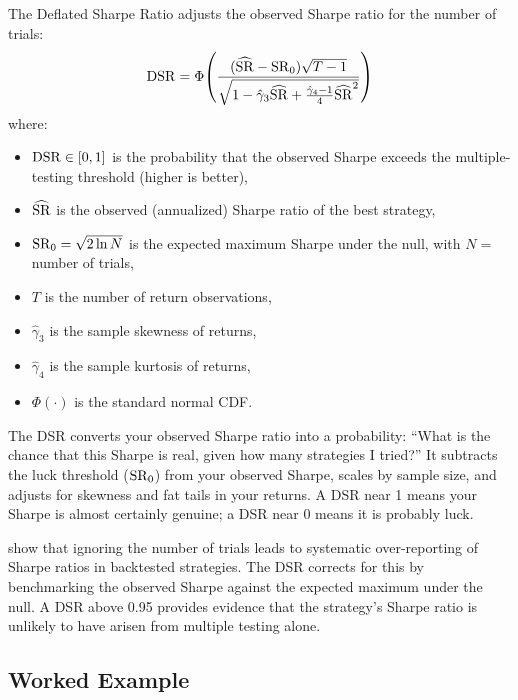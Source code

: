 The Deflated Sharpe Ratio adjusts the observed Sharpe ratio for the number of trials:
\begin{equation}
\label{eq:dsr}
\operatorname{DSR} = \Phi\!\left(\frac{(\widehat{\operatorname{SR}} - \operatorname{SR}_0)\sqrt{T-1}}{\sqrt{1 - \hat{\gamma}_3 \widehat{\operatorname{SR}} + \frac{\hat{\gamma}_4 - 1}{4}\widehat{\operatorname{SR}}^2}}\right)
\end{equation}
where:
\begin{itemize}[nosep]
  \item $\operatorname{DSR} \in [0, 1]$ is the probability that the observed Sharpe exceeds the multiple-testing threshold (higher is better),
  \item $\widehat{\operatorname{SR}}$ is the observed (annualized) Sharpe ratio of the best strategy,
  \item $\operatorname{SR}_0 = \sqrt{2 \ln N}$ is the expected maximum Sharpe under the null, with $N =$ number of trials,
  \item $T$ is the number of return observations,
  \item $\hat{\gamma}_3$ is the sample skewness of returns,
  \item $\hat{\gamma}_4$ is the sample kurtosis of returns,
  \item $\Phi(\cdot)$ is the standard normal CDF.
\end{itemize}

\begin{intuition}
The DSR converts your observed Sharpe ratio into a probability: ``What is the chance that this Sharpe is real, given how many strategies I tried?''
It subtracts the luck threshold ($\operatorname{SR}_0$) from your observed Sharpe, scales by sample size, and adjusts for skewness and fat tails in your returns.
A DSR near 1 means your Sharpe is almost certainly genuine; a DSR near 0 means it is probably luck.
\end{intuition}

\begin{keyresult}
\citet{Bailey2014DSR} show that ignoring the number of trials leads to systematic over-reporting of Sharpe ratios in backtested strategies.
The DSR corrects for this by benchmarking the observed Sharpe against the expected maximum under the null.
A DSR above 0.95 provides evidence that the strategy's Sharpe ratio is unlikely to have arisen from multiple testing alone.
\end{keyresult}

\subsection{Worked Example}


